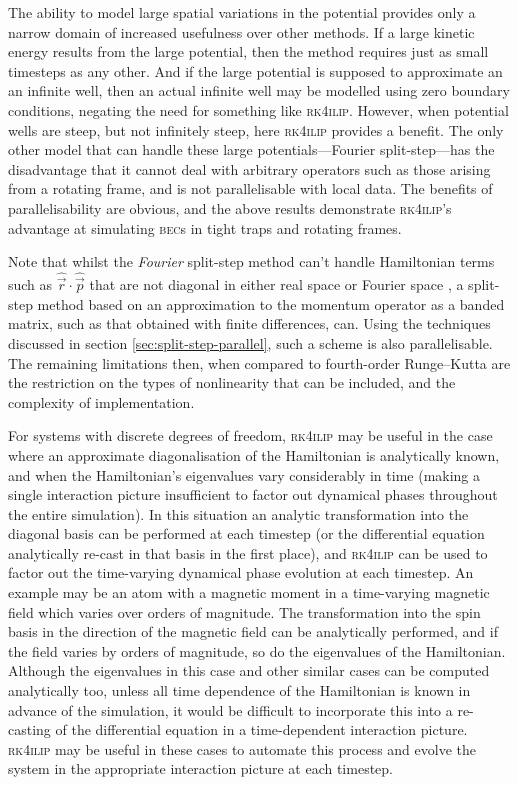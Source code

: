 The ability to model large spatial variations in the potential provides only a narrow domain of increased usefulness over other methods. If a large kinetic energy results from the large potential, then the method requires just as small timesteps as any other. And if the large potential is supposed to approximate an an infinite well, then an actual infinite well may be modelled using zero boundary conditions, negating the need for something like \textsc{rk4ilip}. However, when potential wells are steep, but not infinitely steep, here \textsc{rk4ilip} provides a benefit. The only other model that can handle these large potentials---Fourier split-step---has the disadvantage that it cannot deal with arbitrary operators such as those arising from a rotating frame, and is not parallelisable with local data. The benefits of parallelisability are obvious, and the above results demonstrate \textsc{rk4ilip}'s advantage at simulating \textsc{bec}s in tight traps and rotating frames.

Note that whilst the \emph{Fourier} split-step method can't handle Hamiltonian terms such as $\hat {\vec r} \cdot \hat {\vec p}$ that are not diagonal in either real space or Fourier space \cite[p315]{tannor_introduction_2007}, a split-step method based on an approximation to the momentum operator as a banded matrix, such as that obtained with finite differences, can. Using the techniques discussed in section \ref{sec:split-step-parallel}, such a scheme is also parallelisable. The remaining limitations then, when compared to fourth-order Runge--Kutta are the restriction on the types of nonlinearity that can be included, and the complexity of implementation.

For systems with discrete degrees of freedom, \textsc{rk4ilip} may be useful in the case where an approximate diagonalisation of the Hamiltonian is analytically known, and when the Hamiltonian's eigenvalues vary considerably in time (making a single interaction picture insufficient to factor out dynamical phases throughout the entire simulation). In this situation an analytic transformation into the diagonal basis can be performed at each timestep (or the differential equation analytically re-cast in that basis in the first place), and \textsc{rk4ilip} can be used to factor out the time-varying dynamical phase evolution at each timestep. An example may be an atom with a magnetic moment in a time-varying magnetic field which varies over orders of magnitude. The transformation into the spin basis in the direction of the magnetic field can be analytically performed, and if the field varies by orders of magnitude, so do the eigenvalues of the Hamiltonian. Although the eigenvalues in this case and other similar cases can be computed analytically too, unless all time dependence of the Hamiltonian is known in advance of the simulation, it would be difficult to incorporate this into a re-casting of the differential equation in a time-dependent interaction picture. \textsc{rk4ilip} may be useful in these cases to automate this process and evolve the system in the appropriate interaction picture at each timestep.
